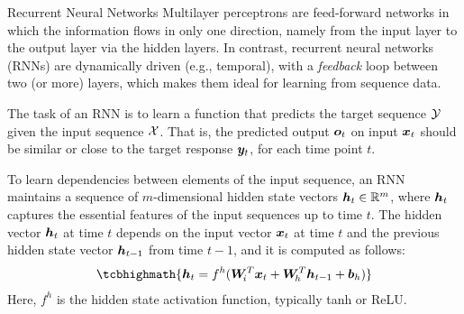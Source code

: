 \begin{frame}{Recurrent Neural Networks}
%
%
Multilayer perceptrons are feed-forward networks in which the
information flows in only one direction, namely from the input layer to
the output layer via the hidden layers. In contrast, recurrent neural
networks (RNNs) are dynamically driven (e.g., temporal), with a {\em
feedback} loop between two (or more) layers, which makes them %
ideal for learning from  sequence data. %
%
%
%

\medskip

The task of an RNN is to learn a
function that predicts the target sequence ${\mathcal Y}$ given the input sequence
${\mathcal X}$. That is, the predicted output ${\boldsymbol o}_t$ on input ${\boldsymbol x}_t$ should be
similar or close to the target response ${\boldsymbol y}_t$, for each time point $t$.


\medskip

To learn dependencies between elements of the input sequence, an RNN maintains
a sequence of $m$-dimensional hidden state vectors ${\boldsymbol h}_t \in {\mathord{\mathbb R}}^m$, where
${\boldsymbol h}_t$ captures the essential features of the input sequences up to time
$t$.%
The hidden vector ${\boldsymbol h}_t$
at time $t$ depends on the input vector ${\boldsymbol x}_t$ at time $t$ and the previous
hidden state vector ${\boldsymbol h}_{t-1}$ from time $t-1$, and it is computed as follows:
\begin{align}
    \tcbhighmath{
    \bh_t = f^h(\bW_{\!i}^T \bx_t + \bW_{\!h}^T
\bh_{t-1} + \bb_{h})}
    \label{eq:reg:deep:hidden_t}
\end{align}
Here, $f^h$ is the hidden state activation function, typically tanh or ReLU. 
\end{frame}
